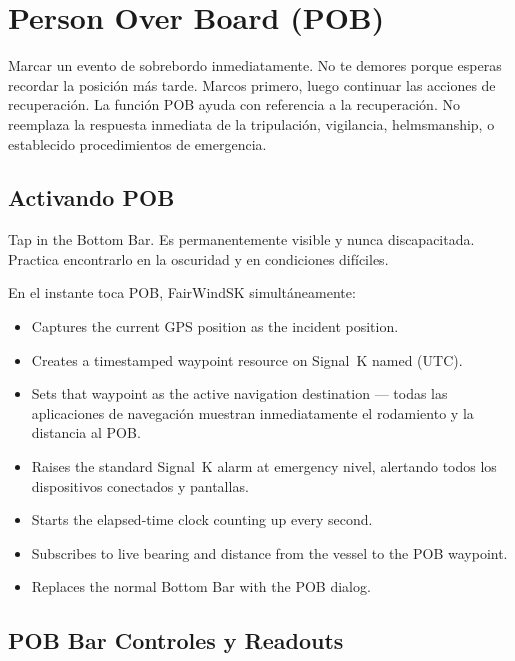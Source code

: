 \chapter{Person Over Board (POB)}
\label{ch:pob}

\begin{warningbox}
Marcar un evento de sobrebordo inmediatamente.
No te demores porque esperas recordar la posición más tarde.
Marcos primero, luego continuar las acciones de recuperación.
La función POB ayuda con referencia a la recuperación.
No reemplaza la respuesta inmediata de la tripulación, vigilancia, helmsmanship, o establecido
procedimientos de emergencia.
\end{warningbox}

\section{Activando POB}

Tap  in the Bottom Bar.
Es permanentemente visible y nunca discapacitada.
Practica encontrarlo en la oscuridad y en condiciones difíciles.

En el instante toca POB, FairWindSK simultáneamente:

\begin{itemize}
  \item Captures the current GPS position as the incident position.
  \item Creates a timestamped waypoint resource on Signal~K named
         (UTC).
  \item Sets that waypoint as the active navigation destination ---
todas las aplicaciones de navegación muestran inmediatamente el rodamiento y la distancia al POB.
  \item Raises the standard Signal~K  alarm at emergency
nivel, alertando todos los dispositivos conectados y pantallas.
  \item Starts the elapsed-time clock counting up every second.
  \item Subscribes to live bearing and distance from the vessel to the POB waypoint.
  \item Replaces the normal Bottom Bar with the POB dialog.
\end{itemize}


\section{POB Bar Controles y Readouts}

